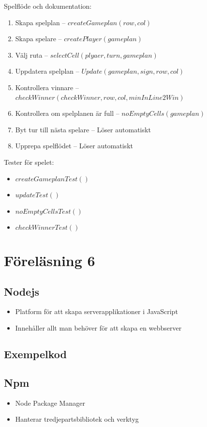 \documentclass[12pt,a4paper]{article}
\begin{document}
Spelflöde och dokumentation:
\begin{enumerate}
    \item Skapa spelplan -- $createGameplan(row,col)$
    \item Skapa spelare -- $createPlayer(gameplan)$
    \item Välj ruta -- $selectCell(plyaer, turn, gameplan)$
    \item Uppdatera spelplan -- $Update(gameplan, sign, row, col)$
    \item Kontrollera vinnare -- $checkWinner(checkWinner, row, col, minInLine2Win)$
    \item Kontrollera om spelplanen är full -- $noEmptyCells(gameplan)$
    \item Byt tur till nästa spelare -- Löser automatiskt
    \item Upprepa spelflödet -- Löser automatiskt
\end{enumerate}

Tester för spelet:
\begin{itemize}
    \item $createGameplanTest()$
    \item $updateTest()$
    \item $noEmptyCellsTest()$
    \item $checkWinnerTest()$
\end{itemize}

\section{Föreläsning 6}
\subsection{Nodejs}
\begin{itemize}
    \item Platform för att skapa serverapplikationer i JavaScript
    \item Innehåller allt man behöver för att skapa en webbserver
\end{itemize}

\subsection{Exempelkod}

\subsection{Npm}
\begin{itemize}
    \item Node Package Manager
    \item Hanterar tredjepartsbibliotek och verktyg
\end{itemize}
\end{document}
